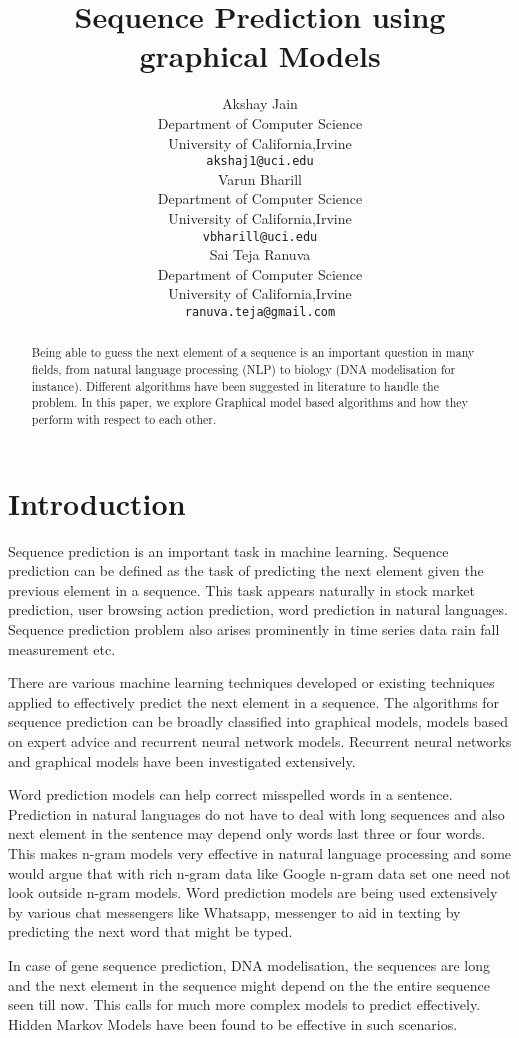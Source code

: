 \documentclass{article} %
\title{Sequence Prediction using graphical Models }
\author{
Akshay Jain\\
Department of Computer Science\\
University of California,Irvine \\
\texttt{akshaj1@uci.edu} \\
\And
Varun Bharill \\
Department of Computer Science\\
University of California,Irvine \\
\texttt{vbharill@uci.edu} \\
\And
Sai Teja Ranuva \\
Department of Computer Science\\
University of California,Irvine \\
\texttt{ranuva.teja@gmail.com} \\
}
\begin{document}
\maketitle

\begin{abstract}
Being able to guess the next element of a sequence is an important question in many fields, from natural language processing (NLP) to biology (DNA modelisation for instance). Different algorithms have been suggested in literature to handle the problem. In this paper, we explore Graphical model based algorithms and how they perform with respect to each other.
\end{abstract}

\section{Introduction}
\label{Introduction}
Sequence prediction is an important task in machine learning. Sequence prediction can be defined as the task of predicting the next element given the previous element in a sequence. This task appears naturally in stock market prediction, user browsing action prediction, word prediction in natural languages. Sequence prediction problem also arises prominently in time series data rain fall measurement etc.

There are various machine learning techniques developed or existing techniques applied to effectively predict the next element in a sequence. The algorithms for sequence prediction can be broadly classified into graphical models, models based on expert advice and recurrent neural network models. Recurrent neural networks and graphical models have been investigated extensively. 

Word prediction models can help correct misspelled words in a sentence. Prediction in natural languages do not have to deal with long sequences and also next element in the sentence may depend only words last three or four words. This makes n-gram models very effective in natural language processing and some would argue that with rich n-gram data like Google n-gram data set one need not look outside n-gram models. Word prediction models are being used extensively by various chat messengers like Whatsapp, messenger to aid in texting by predicting the next word that might be typed.

In case of gene sequence prediction, DNA modelisation, the sequences are long and the next element in the sequence might depend on the the entire sequence seen till now. This calls for much more complex models to predict effectively. Hidden Markov Models have been found to be effective in such scenarios. 
\end{document}

